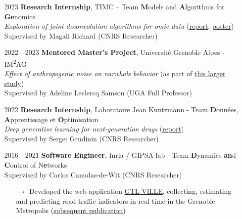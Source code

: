 \documentclass{article}
\begin{document}
\begin{itemize}
    \item[] 2023 \tabto{2cm} \textbf{Research Internship}, TIMC – Team \textbf{M}odels and \textbf{A}lgorithms for \textbf{Ge}nomics \\[.1 cm]
    \tabto{2cm} \textit{Exploration of joint deconvolution algorithms for omic data} (\href{https://vadmbertr.github.io/material/reports/M2_Internship_report__Exploration_of_joint_deconvolution_algorithms_for_omic_data.pdf}{report}, \href{https://vadmbertr.github.io/material/posters/poster_jobim_ismb.pdf}{poster}) \\[.1 cm]
    \tabto{2cm} Supervised by Magali Richard (CNRS Researcher)
    
    \item[] 2022—2023 \tabto{2cm} \textbf{Mentored Master's Project}, Université Grenoble Alpes - IM\textsuperscript{2}AG \\[.1 cm]
    \tabto{2cm} \textit{Effect of anthropogenic noise on narwhals behavior} (as part of \href{https://doi.org/10.1126/sciadv.ade0440}{this larger study}) \\[.1 cm]
    \tabto{2cm} Supervised by Adeline Leclercq Samson (UGA Full Professor)
    
    \item[] 2022 \tabto{2cm} \textbf{Research Internship}, Laboratoire Jean Kuntzmann - Team \textbf{D}onnées, \textbf{A}pprentissage et \textbf{O}ptimisation \\[.1 cm]
    \tabto{2cm} \textit{Deep generative learning for next-generation drugs} (\href{https://vadmbertr.github.io/material/reports/Internship_report___Deep_generative_learning_for_next_generation_drugs.pdf}{report}) \\[.1 cm]
    \tabto{2cm} Supervised by Sergei Grudinin (CNRS Researcher)
    
    \item[] 2016—2021 \tabto{2cm} \textbf{Software Engineer}, Inria / GIPSA-lab - Team \textbf{D}ynamics \textbf{an}d \textbf{C}ontrol of N\textbf{e}tworks\\[.1 cm]
    \tabto{2cm} Supervised by Carlos Canudas-de-Wit (CNRS Researcher)
    \vspace{-.1cm}
    \begin{itemize}[left=2cm]
        \item[$\rightarrow$] Developed the web-application \href{https://gtlville.inrialpes.fr/}{GTL-VILLE}, collecting, estimating and predicting road traffic indicators in real time in the Grenoble Metropolis (\href{https://hal.science/hal-03694936}{subsequent publication})
    \end{itemize}
\end{itemize}
\end{document}

